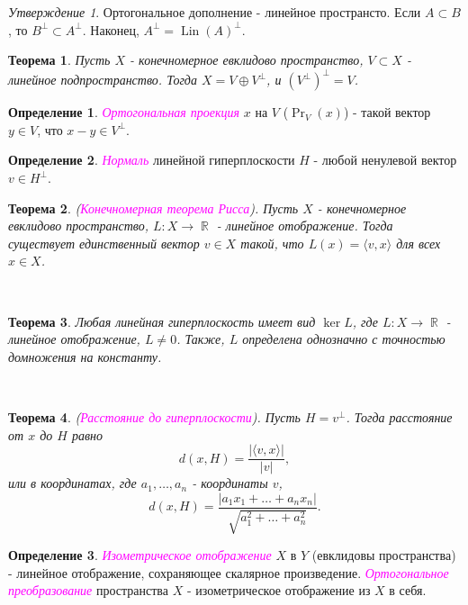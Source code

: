 \documentclass[a4paper,100pt]{article}
\theoremstyle{indented}
\newtheorem{theorem}{Теорема}
\theoremstyle{definition}
\newtheorem{defn}{Определение}
\theoremstyle{remark}
\newtheorem{stat}{Утверждение}
\DeclareMathOperator{\ra}{\rightarrow}
\DeclareMathOperator{\RR}{\mathbb{R}}
\DeclareMathOperator{\Lin}{Lin}
\DeclareMathOperator{\Prf}{Pr}
\begin{document}
\begin{stat}
    Ортогональное дополнение - линейное пространсто. Если $A\subset B$, то $B^{\perp} \subset A^{\perp}$. Наконец, $A^{\perp} = \Lin(A)^{\perp}$. 
\end{stat}

\begin{theorem}
    Пусть $X$ - конечномерное евклидово пространство, $V\subset X$ - линейное подпространство. Тогда $X= V \oplus V^{\perp}$, и $(V^{\perp})^{\perp}=V$.
\end{theorem}

\begin{defn}
    \textit{\textcolor{magenta}{\hypertarget{s68}{Ортогональная проекция}}} $x$ на $V$ ($\Prf_V(x)$) - такой вектор $y\in V$, что $x-y\in V^{\perp}$. 
\end{defn}

\begin{defn}
    \textit{\textcolor{magenta}{\hypertarget{s69}{Нормаль}}} линейной гиперплоскости $H$ - любой ненулевой вектор $v\in H^{\perp}$. 
\end{defn}

\begin{theorem}
    (\textit{\textcolor{magenta}{\hypertarget{s70}{Конечномерная теорема Рисса}}}). Пусть $X$ - конечномерное евклидово пространство, $L:X\ra \RR$ - линейное отображение. Тогда существует единственный вектор $v\in X$ такой, что $L(x)=\langle v, x \rangle$ для всех $x\in X$. 
\end{theorem} \

\begin{theorem}
    Любая линейная гиперплоскость имеет вид $\ker L$, где $L:X\ra \RR$ - линейное отображение, $L\neq 0$. Также, $L$ определена однозначно с точностью домножения на константу.
\end{theorem} \ 

\begin{theorem}
    (\textit{\textcolor{magenta}{\hypertarget{s71}{Расстояние до гиперплоскости}}}). Пусть $H=v^{\perp}$. Тогда расстояние от $x$ до $H$ равно 
    \[
        d(x, H)=\frac{|\langle v, x \rangle|}{|v|}, 
    \]
    или в координатах, где $a_1, \ldots, a_n$ - координаты $v$, 
    \[
        d(x, H)=\frac{|a_1x_1+\ldots+a_n x_n|}{\sqrt{a_1^2+\ldots+a_n^2}}.
    \]
\end{theorem}

\begin{defn}
    \textit{\textcolor{magenta}{\hypertarget{s72}{Изометрическое отображение}}} $X$ в $Y$ (евклидовы пространства) - линейное отображение, сохраняющее скалярное произведение. \textit{\textcolor{magenta}{\hypertarget{s73}{Ортогональное преобразование}}} пространства $X$ - изометрическое отображение из $X$ в себя.
\end{defn}
\end{document}
